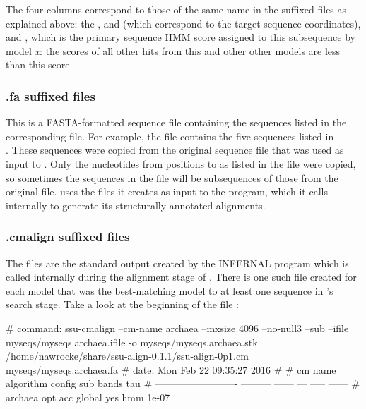 The four columns correspond to those of the same name in the 
suffixed files as explained above: the ,
 and  (which correspond to the target sequence
coordinates), and , which is the primary sequence HMM
score assigned to this subsequence by model \emph{x}: the scores of
all other hits from this and other other models are less than
this score.

\subsubsection{.fa suffixed files}
This is a FASTA-formatted sequence file containing the sequences
listed in the corresponding  file. For example, the
file  contains the five sequences
listed in \\
. These sequences were
copied from the original sequence file  that
was used as input to . Only the nucleotides from
positions  to  as listed in the
 file were copied, so sometimes the sequences in the
 file will be subsequences of those from the original
file.   uses the  files it
creates as input to the  program, which it calls
internally to generate its structurally annotated alignments.

\subsubsection{.cmalign suffixed files}

The  files are the standard output created by the
INFERNAL program  which is called internally
during the alignment stage of . There is one such file
created for each model that was the best-matching model to at least
one sequence in 's search stage. Take a look at the
beginning of the file :

\begin{sreoutputwide}
# command: ssu-cmalign --cm-name archaea --mxsize 4096 --no-null3 --sub --ifile myseqs/myseqs.archaea.ifile 
-o myseqs/myseqs.archaea.stk /home/nawrocke/share/ssu-align-0.1.1/ssu-align-0p1.cm myseqs/myseqs.archaea.fa
# date:    Mon Feb 22 09:35:27 2016
#
# cm name                    algorithm  config  sub  bands     tau
# -------------------------  ---------  ------  ---  -----  ------
# archaea                      opt acc  global  yes    hmm   1e-07
\end{sreoutputwide}

